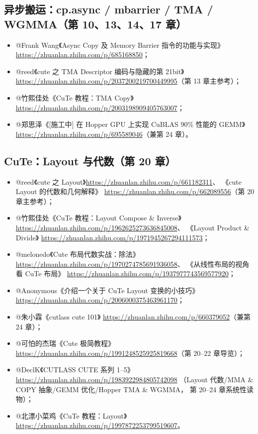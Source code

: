 \subsection{异步搬运：cp.async / mbarrier / TMA / WGMMA（第 10、13、14、17 章）}

\begin{itemize}
  \item @Frank Wang《Async Copy 及 Memory Barrier 指令的功能与实现》
        \url{https://zhuanlan.zhihu.com/p/685168850}；
  \item @reed《cute 之 TMA Descriptor 编码与隐藏的第 21bit》
        \url{https://zhuanlan.zhihu.com/p/2037200219700449995}（第 13 章主参考）；
  \item @竹熙佳处《CuTe 教程：TMA Copy》
        \url{https://zhuanlan.zhihu.com/p/2003198909405763007}；
  \item @郑思泽《[施工中] 在 Hopper GPU 上实现 CuBLAS 90\% 性能的 GEMM》
        \url{https://zhuanlan.zhihu.com/p/695589046}（兼第 24 章）。
\end{itemize}

\subsection{CuTe：Layout 与代数（第 20 章）}

\begin{itemize}
  \item @reed《cute 之 Layout》\url{https://zhuanlan.zhihu.com/p/661182311}、
        《cute Layout 的代数和几何解释》
        \url{https://zhuanlan.zhihu.com/p/662089556}（第 20 章主参考）；
  \item @竹熙佳处《CuTe 教程：Layout Compose \& Inverse》
        \url{https://zhuanlan.zhihu.com/p/1962625273636845008}、
        《Layout Product \& Divide》
        \url{https://zhuanlan.zhihu.com/p/1971945267294111573}；
  \item @melonedo《Cute 布局代数实战：除法》
        \url{https://zhuanlan.zhihu.com/p/1970274785691936058}、
        《从线性布局的视角看 CuTe 布局》
        \url{https://zhuanlan.zhihu.com/p/1937977743569577920}；
  \item @Anonymous《介绍一个关于 CuTe Layout 变换的小技巧》
        \url{https://zhuanlan.zhihu.com/p/2006000375463961170}；
  \item @朱小霖《cutlass cute 101》
        \url{https://zhuanlan.zhihu.com/p/660379052}（兼第 24 章）；
  \item @可怕的杰瑞《Cute 极简教程》
        \url{https://zhuanlan.zhihu.com/p/1991248525925819668}（第 20--22 章导览）；
  \item @DeclK《CUTLASS CUTE 系列 1--5》
        \url{https://zhuanlan.zhihu.com/p/1983922984805742098}
        （Layout 代数/MMA \& COPY 抽象/GEMM 优化/Hopper TMA \& WGMMA，
        第 20--24 章系统性读物）；
  \item @北漂小菜鸡《CuTe 教程：Layout》
        \url{https://zhuanlan.zhihu.com/p/1997872253799519607}。
\end{itemize}

